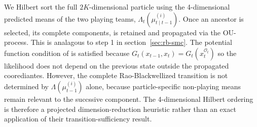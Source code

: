 We Hilbert sort the full $2K$-dimensional particle using the 4-dimensional predicted means of the two playing teams, $\Lambda_t(\mu_{t \mid t-1}^{(i)})$. Once an ancestor is selected, its complete components, is retained and propagated via the OU-process. This is analagous to step 1 in section~\ref{sec:rb-smc}. The potential function condition of \citet{chopingerber2017sqmcintroduction} is satisfied because $G_t(x_{t-1}, x_t) = G_t(x_t^{\mathcal{O}_t})$ so the likelihood does not depend on the previous state outside the propagated coorediantes. However, the complete Rao-Blackwellized transition is not determined by $\Lambda(\mu_{t-1}^{(i)})$ alone, because particle-specific non-playing means remain relevant to the succssive component. The 4-dimensional Hilbert ordering is therefore a projected dimension-reduction heuristic rather than an exact application of their transition-sufficiency result.






